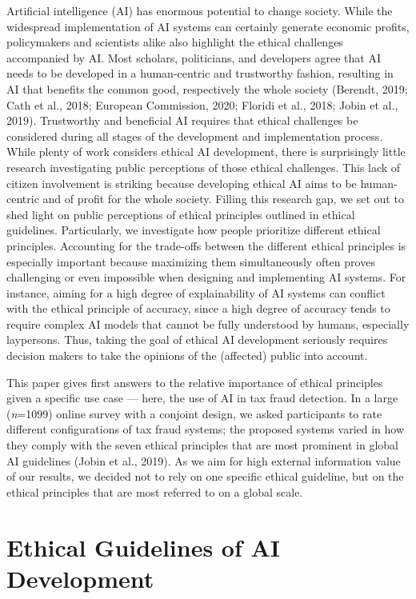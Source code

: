 \documentclass{article}
\begin{document}
Artificial intelligence (AI) has enormous potential to change society.
While the widespread implementation of AI systems can certainly generate
economic profits, policymakers and scientists alike also highlight the
ethical challenges accompanied by AI. Most scholars, politicians, and
developers agree that AI needs to be developed in a human-centric and
trustworthy fashion, resulting in AI that benefits the common good,
respectively the whole society (Berendt, 2019; Cath et al., 2018;
European Commission, 2020; Floridi et al., 2018; Jobin et al., 2019).
Trustworthy and beneficial AI requires that ethical challenges be
considered during all stages of the development and implementation
process. While plenty of work considers ethical AI development, there is
surprisingly little research investigating public perceptions of those
ethical challenges. This lack of citizen involvement is striking because
developing ethical AI aims to be human-centric and of profit for the
whole society. Filling this research gap, we set out to shed light on
public perceptions of ethical principles outlined in ethical guidelines.
Particularly, we investigate how people prioritize different ethical
principles. Accounting for the trade-offs between the different ethical
principles is especially important because maximizing them
simultaneously often proves challenging or even impossible when
designing and implementing AI systems. For instance, aiming for a high
degree of explainability of AI systems can conflict with the ethical
principle of accuracy, since a high degree of accuracy tends to require
complex AI models that cannot be fully understood by humans, especially
laypersons. Thus, taking the goal of ethical AI development seriously
requires decision makers to take the opinions of the (affected) public
into account.

This paper gives first answers to the relative importance of ethical
principles given a specific use case --- here, the use of AI in tax
fraud detection. In a large (\emph{n}=1099) online survey with a
conjoint design, we asked participants to rate different configurations
of tax fraud systems; the proposed systems varied in how they comply
with the seven ethical principles that are most prominent in global AI
guidelines (Jobin et al., 2019). As we aim for high external information
value of our results, we decided not to rely on one specific ethical
guideline, but on the ethical principles that are most referred to on a
global scale.

\hypertarget{ethical-guidelines-of-ai-development}{%
\section{Ethical Guidelines of AI
Development}\label{ethical-guidelines-of-ai-development}}
\end{document}

